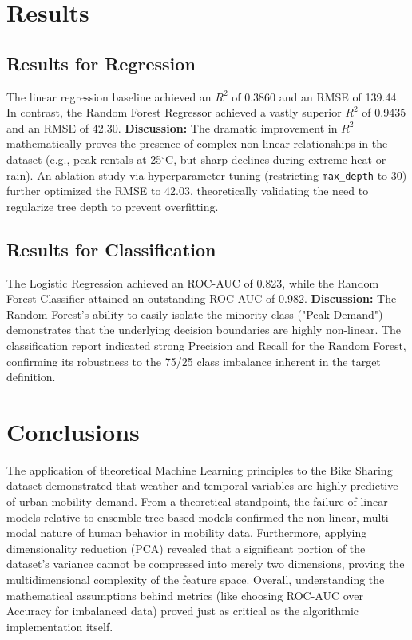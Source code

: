 \documentclass[12pt,a4paper]{article}
\begin{document}
\section{Results}
\subsection{Results for Regression}
The linear regression baseline achieved an $R^2$ of 0.3860 and an RMSE of 139.44. In contrast, the Random Forest Regressor achieved a vastly superior $R^2$ of 0.9435 and an RMSE of 42.30. 
\textbf{Discussion:} The dramatic improvement in $R^2$ mathematically proves the presence of complex non-linear relationships in the dataset (e.g., peak rentals at 25$^{\circ}$C, but sharp declines during extreme heat or rain). An ablation study via hyperparameter tuning (restricting \texttt{max\_depth} to 30) further optimized the RMSE to 42.03, theoretically validating the need to regularize tree depth to prevent overfitting.

\subsection{Results for Classification}
The Logistic Regression achieved an ROC-AUC of 0.823, while the Random Forest Classifier attained an outstanding ROC-AUC of 0.982. 
\textbf{Discussion:} The Random Forest's ability to easily isolate the minority class ("Peak Demand") demonstrates that the underlying decision boundaries are highly non-linear. The classification report indicated strong Precision and Recall for the Random Forest, confirming its robustness to the 75/25 class imbalance inherent in the target definition.

\section{Conclusions}
The application of theoretical Machine Learning principles to the Bike Sharing dataset demonstrated that weather and temporal variables are highly predictive of urban mobility demand.
From a theoretical standpoint, the failure of linear models relative to ensemble tree-based models confirmed the non-linear, multi-modal nature of human behavior in mobility data. Furthermore, applying dimensionality reduction (PCA) revealed that a significant portion of the dataset's variance cannot be compressed into merely two dimensions, proving the multidimensional complexity of the feature space. Overall, understanding the mathematical assumptions behind metrics (like choosing ROC-AUC over Accuracy for imbalanced data) proved just as critical as the algorithmic implementation itself.
\end{document}
